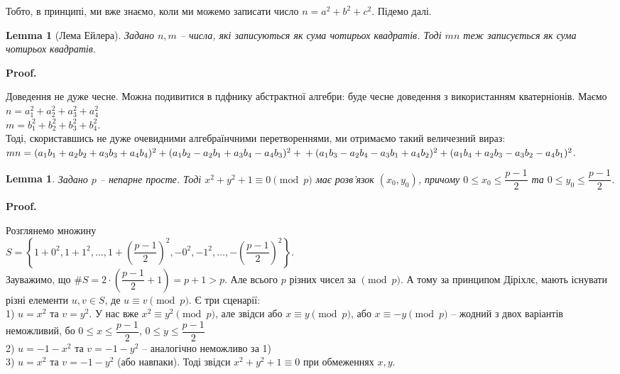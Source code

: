 \documentclass[a4paper, 14pt]{extarticle}
\makeatletter
\theoremstyle{theoremdd}
\theoremstyle{theoremdd}
\theoremstyle{theoremdd}
\theoremstyle{theoremdd}
\theoremstyle{theoremdd}
\theoremstyle{theoremdd}
\theoremstyle{theoremdd}
\newtheorem{lemma}[theorem]{Lemma}
\theoremstyle{theoremdd}
\def\qed{$\blacksquare$}
\renewenvironment{proof}[1][Proof.\\]{\par
\pushQED{\hfill \qed}%
\normalfont \topsep6\p@\@plus6\p@\relax
\trivlist
\item\relax
{\bfseries
#1\@addpunct{.}}\hspace\labelsep\ignorespaces
}{%
\popQED\endtrivlist\@endpefalse
}
\makeatother
\begin{document}
Тобто, в принципі, ми вже знаємо, коли ми можемо записати число $n = a^2+b^2+c^2$. Підемо далі.

\begin{lemma}[Лема Ейлера]
Задано $n,m$ -- числа, які записуються як сума чотирьох квадратів. Тоді $mn$ теж записується як сума чотирьох квадратів.
\end{lemma}

\begin{proof}
Доведення не дуже чесне. Можна подивитися в пдфнику абстрактної алгебри: буде чесне доведення з використанням кватерніонів. Маємо\\
$n = a_1^2+a_2^2+a_3^2+a_4^2$\\
$m = b_1^2+b_2^2+b_3^2+b_4^2$.\\
Тоді, скориставшись не дуже очевидними алгебраїнчними перетвореннями, ми отримаємо такий величезний вираз:\\
$mn = (a_1b_1+a_2b_2+a_3b_3+a_4b_4)^2 + (a_1b_2-a_2b_1+a_3b_4-a_4b_3)^2 + \\ + (a_1b_3-a_2b_4-a_3b_1+a_4b_2)^2 + (a_1b_4+a_2b_3-a_3b_2-a_4b_1)^2$.
\end{proof}

\begin{lemma}
Задано $p$ -- непарне просте. Тоді $x^2+y^2+1 \equiv 0 \pmod p$ має розв'язок $(x_0,y_0)$, причому $0 \leq x_0 \leq \dfrac{p-1}{2}$ та $0 \leq y_0 \leq \dfrac{p-1}{2}$.
\end{lemma}

\begin{proof}
Розглянемо множину \\ $S = \left\{ 1+0^2, 1+1^2, \dots, 1+ \left( \dfrac{p-1}{2} \right)^2, -0^2,-1^2,\dots,-\left( \dfrac{p-1}{2} \right)^2 \right\}$.\\
Зауважимо, що $\# S = 2 \cdot \left( \dfrac{p-1}{2} +1 \right) = p+1 > p$. Але всього $p$ різних чисел за $\!\pmod p$. А тому за принципом Діріхлє, мають існувати різні елементи $u,v \in S$, де $u \equiv v \pmod p$. Є три сценарії:\\
1) $u = x^2$ та $v = y^2$. У нас вже $x^2 \equiv y^2 \pmod p$, але звідси або $x \equiv y \pmod p$, або $x \equiv -y \pmod p$ -- жодний з двох варіантів неможливий, бо $0 \leq x \leq \dfrac{p-1}{2}$, $0 \leq y \leq \dfrac{p-1}{2}$\\
2) $u = -1-x^2$ та $v = -1-y^2$ -- аналогічно неможливо за 1)\\
3) $u = x^2$ та $v = -1-y^2$ (або навпаки). Тоді звідси $x^2+y^2+1 \equiv 0$ при обмеженнях $x,y$.
\end{proof}
\end{document}
